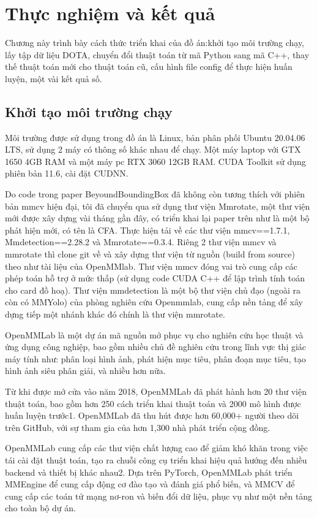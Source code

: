 \documentclass[12pt,a4paper,openany,oneside]{report}
\begin{document}
\chapter{Thực nghiệm và kết quả}

Chương này trình bày cách thức triển khai của đồ án:khởi tạo môi trường chạy, lấy tập dữ liệu DOTA, chuyển đổi thuật toán từ mã Python sang mã C++, thay thế thuật toán mới cho thuật toán cũ, cấu hình file config để thực hiện huấn luyện, một vài kết quả số.
\section{Khởi tạo môi trường chạy} 

Môi trường được sử dụng trong đồ án là Linux, bản phân phối Ubuntu 20.04.06 LTS, sử dụng 2 máy có thông số khác nhau để chạy. Một máy laptop với GTX 1650 4GB RAM và một máy pc RTX 3060 12GB RAM. CUDA Toolkit sử dụng phiên bản 11.6, cài đặt CUDNN.

Do code trong paper BeyoundBoundingBox đã không còn tương thích với phiên bản mmcv hiện đại, tôi đã chuyển qua sử dụng thư viện Mmrotate, một thư viện mới được xây dựng vài tháng gần đây, có triển khai lại paper trên như là một bộ phát hiện mới, có tên là CFA. Thực hiện tải về các thư viện mmcv==1.7.1, Mmdetection==2.28.2 và Mmrotate==0.3.4. Riêng 2 thư viện mmcv và mmrotate thì clone git về và xây dựng thư viện từ nguồn (build from source) theo như tài liệu của OpenMMlab. Thư viện mmcv đóng vai trò cung cấp các phép toán hỗ trợ ở mức thấp (sử dụng code CUDA C++ để lập trình tính toán cho card đồ hoạ). Thư viện mmdetection là một bộ thư viện chủ đạo (ngoài ra còn có MMYolo) của phòng nghiên cứu Openmmlab, cung cấp nền tảng để xây dựng tiếp một nhánh khác đó chính là thư viện mmrotate. 

OpenMMLab là một dự án mã nguồn mở phục vụ cho nghiên cứu học thuật và ứng dụng công nghiệp, bao gồm nhiều chủ đề nghiên cứu trong lĩnh vực thị giác máy tính như: phân loại hình ảnh, phát hiện mục tiêu, phân đoạn mục tiêu, tạo hình ảnh siêu phân giải, và nhiều hơn nữa.

Từ khi được mở cửa vào năm 2018, OpenMMLab đã phát hành hơn 20 thư viện thuật toán, bao gồm hơn 250 cách triển khai thuật toán và 2000 mô hình được huấn luyện trước1. OpenMMLab đã thu hút được hơn 60,000+ người theo dõi trên GitHub, với sự tham gia của hơn 1,300 nhà phát triển cộng đồng.

OpenMMLab cung cấp các thư viện chất lượng cao để giảm khó khăn trong việc tái cài đặt thuật toán, tạo ra chuỗi công cụ triển khai hiệu quả hướng đến nhiều backend và thiết bị khác nhau2. Dựa trên PyTorch, OpenMMLab phát triển MMEngine để cung cấp động cơ đào tạo và đánh giá phổ biến, và MMCV để cung cấp các toán tử mạng nơ-ron và biến đổi dữ liệu, phục vụ như một nền tảng cho toàn bộ dự án.
\end{document}
